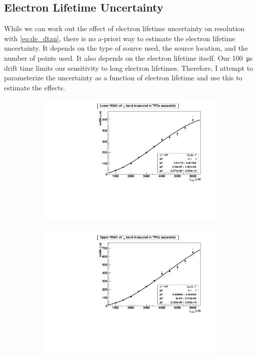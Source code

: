 \documentclass[herrin-thesis.tex]{subfiles}
\begin{document}
\subsection{Electron Lifetime Uncertainty}
\label{subsec:dtau}
While we can work out the effect of electron lifetime uncertainty on resolution with \cref{eq:de_dtau}, there is no a-priori way to estimate the electron lifetime uncertainty. It depends on the type of source used, the source location, and the number of points used. It also depends on the electron lifetime itself. Our \SI{100}{\micro\second} drift time limits our sensitivity to long electron lifetimes. Therefore, I attempt to parameterize the uncertainty as a function of electron lifetime and use this to estimate the effects.

\begin{figure}[htbp]
\begin{subfigure}[b]{0.5\linewidth}
\centering
\includegraphics[width=1.0\columnwidth]{./plots/el_sim_errm_fit.pdf}
\end{subfigure}%
\begin{subfigure}[b]{0.5\linewidth}
\centering
\includegraphics[width=1.0\columnwidth]{./plots/el_sim_errp_fit.pdf}

\end{subfigure}
\end{figure}
\end{document}
